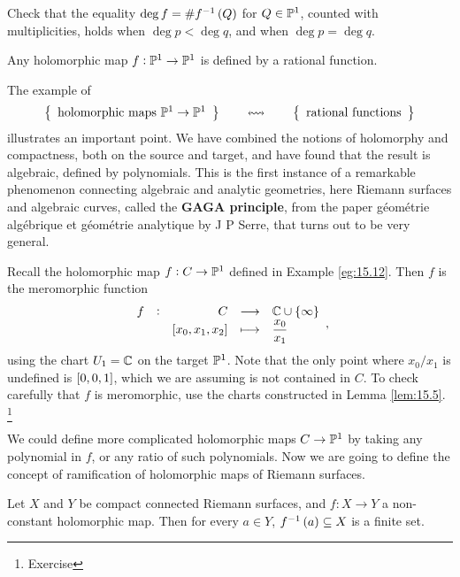 \begin{exercise**}
Check that the equality $ \deg f = \#f^{-1}\br{Q} $ for $ Q \in \mathbb{P}^1 $, counted with multiplicities, holds when $ \deg p < \deg q $, and when $ \deg p = \deg q $.
\end{exercise**}

\begin{exercise**}
Any holomorphic map $ f : \mathbb{P}^1 \to \mathbb{P}^1 $ is defined by a rational function.
\end{exercise**}

\begin{remark}
The example of
$$ \correspondence{\text{holomorphic maps} \ \PP^1 \to \PP^1}{\text{rational functions}} $$
illustrates an important point. We have combined the notions of holomorphy and compactness, both on the source and target, and have found that the result is algebraic, defined by polynomials. This is the first instance of a remarkable phenomenon connecting algebraic and analytic geometries, here Riemann surfaces and algebraic curves, called the \textbf{GAGA principle}, from the paper g\'eom\'etrie alg\'ebrique et g\'eom\'etrie analytique by J P Serre, that turns out to be very general.
\end{remark}

\begin{example}
Recall the holomorphic map $ f : C \to \mathbb{P}^1 $ defined in Example \ref{eg:15.12}. Then $ f $ is the meromorphic function
$$ \function[f]{C}{\CC \cup \cbr{\infty}}{\sbr{x_0, x_1, x_2}}{\dfrac{x_0}{x_1}}, $$
using the chart $ U_1 = \mathbb{C} $ on the target $ \mathbb{P}^1 $. Note that the only point where $ x_0 / x_1 $ is undefined is $ \sbr{0, 0, 1} $, which we are assuming is not contained in $ C $. To check carefully that $ f $ is meromorphic, use the charts constructed in Lemma \ref{lem:15.5}. \footnote{Exercise}
\end{example}


We could define more complicated holomorphic maps $ C \to \mathbb{P}^1 $ by taking any polynomial in $ f $, or any ratio of such polynomials. Now we are going to define the concept of ramification of holomorphic maps of Riemann surfaces.

\begin{proposition}
\label{prop:17.7}
Let $ X $ and $ Y $ be compact connected Riemann surfaces, and $ f : X \to Y $ a non-constant holomorphic map. Then for every $ a \in Y $, $ f^{-1}\br{a} \subseteq X $ is a finite set.
\end{proposition}

